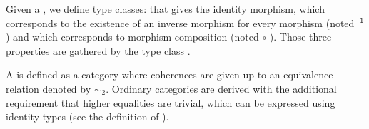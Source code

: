 Given a , we define type classes:  that gives the
  identity morphism,  which corresponds to the existence of an
  inverse morphism for every morphism (noted  $\hspace{-1ex}^{-1}$) and 
  which corresponds to morphism composition (noted  $\circ$ ). Those three
  properties are gathered by the type class .\begin{coqdoccode}
\end{coqdoccode}
  A  is defined as a category
  where coherences are given up-to an equivalence relation denoted by
  $\sim_2$.  Ordinary categories are derived with the additional requirement
  that higher equalities are trivial, which can be expressed using
  identity types (see the definition of ).  


